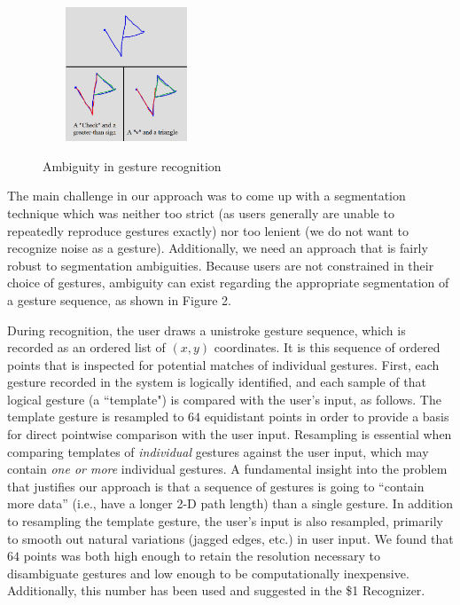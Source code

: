 \documentclass[twoside]{article}
\begin{document}
\begin{multicols}{2}
\begin{figure}[H]
	\centering
	\includegraphics[height=4cm, width=5cm]{Images/Ambiguity1.png}
	\label{fig2}
	\caption{Ambiguity in gesture recognition}
\end{figure}

The main challenge in our approach was to come up with a segmentation 
technique which was neither too strict (as users
generally are unable to repeatedly reproduce gestures exactly) nor too lenient
(we do not want to recognize noise as a gesture). Additionally, we need an approach
that is fairly robust to segmentation ambiguities. Because users are not constrained in their choice of gestures,
ambiguity can exist regarding the appropriate segmentation of a gesture sequence, as shown
in Figure 2.

During recognition, the user draws a unistroke gesture sequence, which is recorded as an ordered
list of $(x,y)$ coordinates. It is this sequence of ordered points that is
inspected for potential matches of individual gestures. First, each
gesture recorded in the system is logically identified, and each sample of that
logical gesture (a ``template") is compared with the user's input, as follows.
The template gesture is resampled to $64$ equidistant points in order to provide
a basis for direct pointwise comparison with the user input. Resampling is
essential when comparing templates of \emph{individual} gestures against the
user input, which may contain \emph{one or more} individual gestures. A
fundamental insight into the problem that justifies our approach is that a
sequence of gestures is going to ``contain more data'' (i.e., have a longer 2-D
path length) than a single gesture. In addition to resampling the template
gesture, the user's input is also resampled, primarily to smooth out natural
variations (jagged edges, etc.) in user input. We found that $64$ points was
both high enough to retain the resolution necessary to disambiguate gestures and
low enough to be computationally inexpensive. Additionally, this number has
been used and suggested in the \$1 Recognizer\cite{wobbrock2007gestures}.


\end{multicols}
\end{document}
